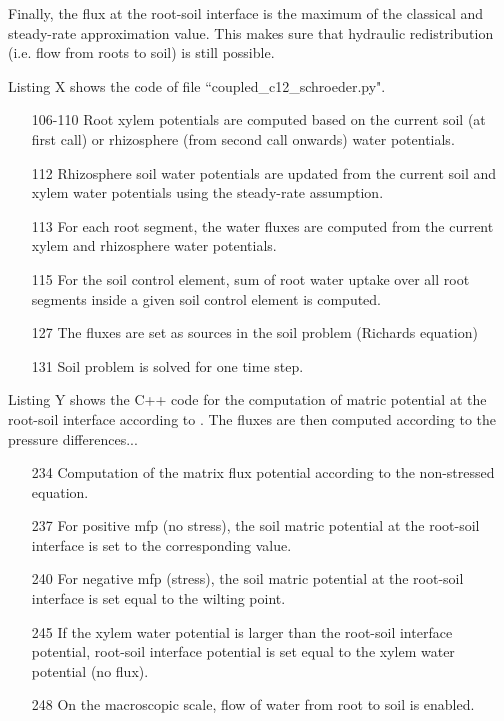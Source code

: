 Finally, the flux at the root-soil interface is the maximum of the classical and steady-rate approximation value. This makes sure that hydraulic redistribution (i.e. flow from roots to soil) is still possible. 

Listing X shows the code of file ``coupled\_c12\_schroeder.py".
%

\begin{itemize}
\item[106-110] Root xylem potentials are computed based on the current soil (at first call) or rhizosphere (from second call onwards) water potentials. 
\item[112] Rhizosphere soil water potentials are updated from the current soil and xylem water potentials using the steady-rate assumption. 
\item[113] For each root segment, the water fluxes are computed from the current xylem and rhizosphere water potentials. 
\item[115] For the soil control element, sum of root water uptake over all root segments inside a given soil control element is computed. 
\item[127] The fluxes are set as sources in the soil problem (Richards equation)
\item[131] Soil problem is solved for one time step. 
\end{itemize}

   
Listing Y shows the C++ code for the computation of matric potential at the root-soil interface according to \citep{Schroeder2008}. The fluxes are then computed according to the pressure differences...
%

\begin{itemize}
\item[234] Computation of the matrix flux potential according to the non-stressed equation. 
\item[237] For positive mfp (no stress), the soil matric potential at the root-soil interface is set to the corresponding value.
\item[240] For negative mfp (stress), the soil matric potential at the root-soil interface is set equal to the wilting point. 
\item[245] If the xylem water potential is larger than the root-soil interface potential, root-soil interface potential is set equal to the xylem water potential (no flux). 
\item[248] On the macroscopic scale, flow of water from root to soil is enabled. 
\end{itemize}


